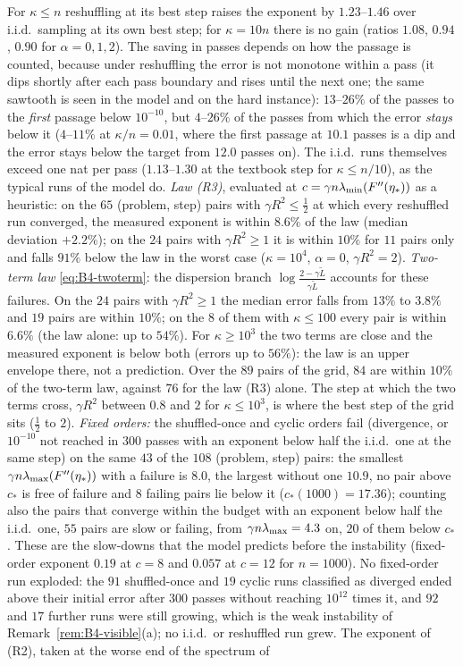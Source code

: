 \noindent For $\kappa\le n$ reshuffling at its best step raises the exponent by $1.23$--$1.46$ over i.i.d.\ sampling at its own best step; for $\kappa=10n$ there is no gain (ratios $1.08$, $0.94$, $0.90$ for $\alpha=0,1,2$). The saving in passes depends on how the passage is counted, because under reshuffling the error is not monotone within a pass (it dips shortly after each pass boundary and rises until the next one; the same sawtooth is seen in the model and on the hard instance): $13$--$26\%$ of the passes to the \emph{first} passage below $10^{-10}$, but $4$--$26\%$ of the passes from which the error \emph{stays} below it ($4$--$11\%$ at $\kappa/n=0.01$, where the first passage at $10.1$ passes is a dip and the error stays below the target from $12.0$ passes on). The i.i.d.\ runs themselves exceed one nat per pass ($1.13$--$1.30$ at the textbook step for $\kappa\le n/10$), as the typical runs of the model do. \emph{Law (R3)}, evaluated at $c=\gamma n\lambda_{\min}(F''(\eta_\ast))$ as a heuristic: on the $65$ (problem, step) pairs with $\gamma R^2\le\frac12$ at which every reshuffled run converged, the measured exponent is within $8.6\%$ of the law (median deviation $+2.2\%$); on the $24$ pairs with $\gamma R^2\ge1$ it is within $10\%$ for $11$ pairs only and falls $91\%$ below the law in the worst case ($\kappa=10^4$, $\alpha=0$, $\gamma R^2=2$). \emph{Two-term law} \eqref{eq:B4-twoterm}: the dispersion branch $\log\frac{2-\gamma\tilde L}{\gamma\tilde L}$ accounts for these failures. On the $24$ pairs with $\gamma R^2\ge1$ the median error falls from $13\%$ to $3.8\%$ and $19$ pairs are within $10\%$; on the $8$ of them with $\kappa\le100$ every pair is within $6.6\%$ (the law alone: up to $54\%$). For $\kappa\ge10^3$ the two terms are close and the measured exponent is below both (errors up to $56\%$): the law is an upper envelope there, not a prediction. Over the $89$ pairs of the grid, $84$ are within $10\%$ of the two-term law, against $76$ for the law (R3) alone. The step at which the two terms cross, $\gamma R^2$ between $0.8$ and $2$ for $\kappa\le10^3$, is where the best step of the grid sits ($\frac12$ to $2$). \emph{Fixed orders:} the shuffled-once and cyclic orders fail (divergence, or $10^{-10}$ not reached in $300$ passes with an exponent below half the i.i.d.\ one at the same step) on the same $43$ of the $108$ (problem, step) pairs: the smallest $\gamma n\lambda_{\max}(F''(\eta_\ast))$ with a failure is $8.0$, the largest without one $10.9$, no pair above $c_\ast$ is free of failure and $8$ failing pairs lie below it ($c_\ast(1000)=17.36$); counting also the pairs that converge within the budget with an exponent below half the i.i.d.\ one, $55$ pairs are slow or failing, from $\gamma n\lambda_{\max}=4.3$ on, $20$ of them below $c_\ast$. These are the slow-downs that the model predicts before the instability (fixed-order exponent $0.19$ at $c=8$ and $0.057$ at $c=12$ for $n=1000$). No fixed-order run exploded: the $91$ shuffled-once and $19$ cyclic runs classified as diverged ended above their initial error after $300$ passes without reaching $10^{12}$ times it, and $92$ and $17$ further runs were still growing, which is the weak instability of Remark~\ref{rem:B4-visible}(a); no i.i.d.\ or reshuffled run grew. The exponent of (R2), taken at the worse end of the spectrum of 